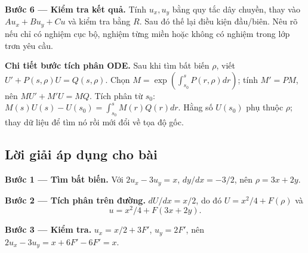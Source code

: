 \documentclass[10pt,a4paper]{article}
\begin{document}
\textbf{Bước 6 — Kiểm tra kết quả.} Tính $u_x,u_y$ bằng quy tắc dây chuyền, thay vào $Au_x+Bu_y+Cu$ và kiểm tra bằng $R$. Sau đó thế lại điều kiện đầu/biên. Nêu rõ nếu chỉ có nghiệm cục bộ, nghiệm từng miền hoặc không có nghiệm trong lớp trơn yêu cầu.

\textbf{Chi tiết bước tích phân ODE.} Sau khi tìm bất biến $\rho$, viết $U'+P(s,\rho)U=Q(s,\rho)$. Chọn $M=\exp(\int_{s_0}^{s}P(r,\rho)dr)$; tính $M'=PM$, nên $MU'+M'U=MQ$. Tích phân từ $s_0$: $M(s)U(s)-U(s_0)=\int_{s_0}^sM(r)Q(r)dr$. Hằng số $U(s_0)$ phụ thuộc $\rho$; thay dữ liệu để tìm nó rồi mới đổi về tọa độ gốc.
\subsection*{Lời giải áp dụng cho bài}
\textbf{Bước 1 — Tìm bất biến.} Với $2u_x-3u_y=x$, $dy/dx=-3/2$, nên $\rho=3x+2y$.

\textbf{Bước 2 — Tích phân trên đường.} $dU/dx=x/2$, do đó $U=x^2/4+F(\rho)$ và
\[u=x^2/4+F(3x+2y).\]

\textbf{Bước 3 — Kiểm tra.} $u_x=x/2+3F'$, $u_y=2F'$, nên $2u_x-3u_y=x+6F'-6F'=x$.
\end{document}
